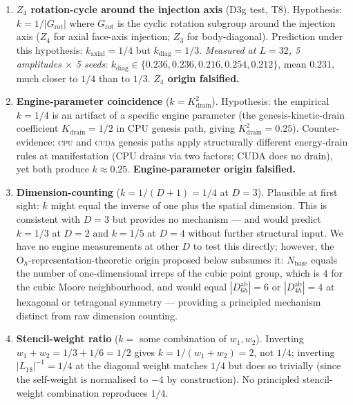 \documentclass[11pt,reqno]{amsart}
\theoremstyle{plain}
\theoremstyle{definition}
\theoremstyle{remark}
\numberwithin{equation}{section}
\newcommand{\Ohgrp}{\mathrm{O}_h}
\newcommand{\Nbase}{N_{\mathrm{base}}}
\begin{document}
\begin{enumerate}
\item \textbf{$Z_{4}$ rotation-cycle around the injection axis} (D3g
test, T8). Hypothesis: $k = 1/|G_{\mathrm{rot}}|$ where
$G_{\mathrm{rot}}$ is the cyclic rotation subgroup around the
injection axis ($Z_{4}$ for axial face-axis injection; $Z_{3}$ for
body-diagonal). Prediction under this hypothesis: $k_{\mathrm{axial}}
= 1/4$ but $k_{\mathrm{diag}} = 1/3$. \emph{Measured at $L=32$,
5 amplitudes $\times$ 5 seeds}: $k_{\mathrm{diag}} \in \{0.236, 0.236,
0.216, 0.254, 0.212\}$, mean $0.231$, much closer to $1/4$ than to
$1/3$. \textbf{$Z_{4}$ origin falsified.}

\item \textbf{Engine-parameter coincidence} ($k = K_{\mathrm{drain}}^{2}$).
Hypothesis: the empirical $k = 1/4$ is an artifact of a specific
engine parameter (the genesis-kinetic-drain coefficient
$K_{\mathrm{drain}} = 1/2$ in CPU genesis path, giving
$K_{\mathrm{drain}}^{2} = 0.25$). Counter-evidence: \textsc{cpu} and
\textsc{cuda} genesis paths apply structurally different energy-drain
rules at manifestation (CPU drains via two factors; CUDA does no
drain), yet both produce $k \approx 0.25$. \textbf{Engine-parameter
origin falsified.}

\item \textbf{Dimension-counting} ($k = 1/(D{+}1) = 1/4$ at $D = 3$).
Plausible at first sight: $k$ might equal the inverse of one plus
the spatial dimension. This is consistent with $D = 3$ but provides
no mechanism — and would predict $k = 1/3$ at $D = 2$ and $k = 1/5$
at $D = 4$ without further structural input. We have no engine
measurements at other $D$ to test this directly; however, the
$\Ohgrp$-representation-theoretic origin proposed below subsumes
it: $\Nbase$ equals the number of one-dimensional irreps of the
cubic point group, which is $4$ for the cubic Moore neighbourhood,
and would equal $|D_{6h}^{\mathrm{ab}}| = 6$ or $|D_{4h}^{\mathrm{ab}}| = 4$
at hexagonal or tetragonal symmetry — providing a principled
mechanism distinct from raw dimension counting.

\item \textbf{Stencil-weight ratio} ($k = $ some combination of
$w_{1}, w_{2}$). Inverting $w_{1} + w_{2} = 1/3 + 1/6 = 1/2$ gives
$k = 1/(w_{1} + w_{2}) = 2$, not $1/4$; inverting $|L_{18}|^{-1}
= 1/4$ at the diagonal weight matches $1/4$ but does so trivially
(since the self-weight is normalised to $-4$ by construction). No
principled stencil-weight combination reproduces $1/4$.
\end{enumerate}
\end{document}
